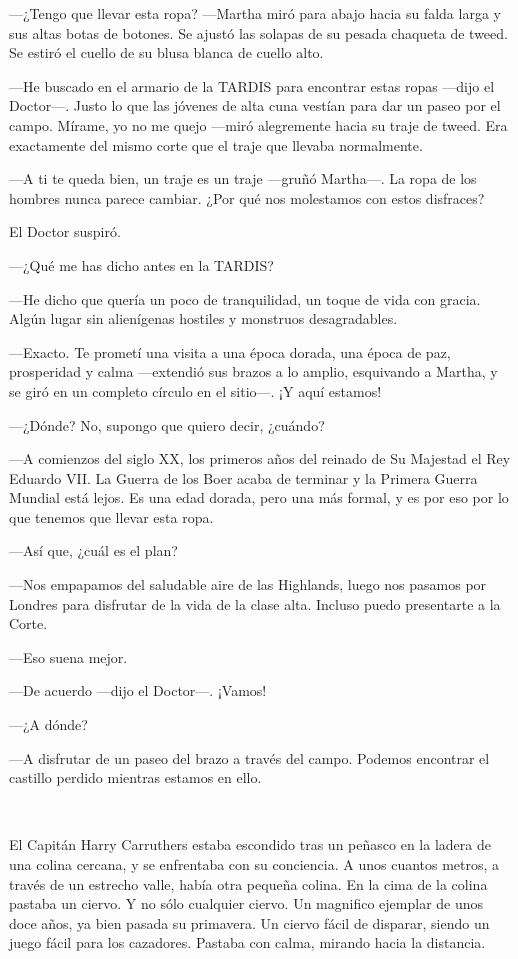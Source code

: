 ---¿Tengo que llevar esta ropa? ---Martha miró para abajo hacia su falda
larga y sus altas botas de botones. Se ajustó las solapas de su pesada
chaqueta de tweed. Se estiró el cuello de su blusa blanca de cuello
alto.

---He buscado en el armario de la TARDIS para encontrar estas ropas
---dijo el Doctor---. Justo lo que las jóvenes de alta cuna vestían para
dar un paseo por el campo. Mírame, yo no me quejo ---miró alegremente
hacia su traje de tweed. Era exactamente del mismo corte que el traje
que llevaba normalmente.

---A ti te queda bien, un traje es un traje ---gruñó Martha---. La ropa
de los hombres nunca parece cambiar. ¿Por qué nos molestamos con estos
disfraces?

El Doctor suspiró.

---¿Qué me has dicho antes en la TARDIS?

---He dicho que quería un poco de tranquilidad, un toque de vida con
gracia. Algún lugar sin alienígenas hostiles y monstruos desagradables.

---Exacto. Te prometí una visita a una época dorada, una época de paz,
prosperidad y calma ---extendió sus brazos a lo amplio, esquivando a
Martha, y se giró en un completo círculo en el sitio---. ¡Y aquí
estamos!

---¿Dónde? No, supongo que quiero decir, ¿cuándo?

---A comienzos del siglo XX, los primeros años del reinado de Su
Majestad el Rey Eduardo VII. La Guerra de los Boer acaba de terminar y
la Primera Guerra Mundial está lejos. Es una edad dorada, pero una más
formal, y es por eso por lo que tenemos que llevar esta ropa.

---Así que, ¿cuál es el plan?

---Nos empapamos del saludable aire de las Highlands, luego nos pasamos
por Londres para disfrutar de la vida de la clase alta. Incluso puedo
presentarte a la Corte.

---Eso suena mejor.

---De acuerdo ---dijo el Doctor---. ¡Vamos!

---¿A dónde?

---A disfrutar de un paseo del brazo a través del campo. Podemos
encontrar el castillo perdido mientras estamos en ello.

~

El Capitán Harry Carruthers estaba escondido tras un peñasco en la
ladera de una colina cercana, y se enfrentaba con su conciencia. A unos
cuantos metros, a través de un estrecho valle, había otra pequeña
colina. En la cima de la colina pastaba un ciervo. Y no sólo cualquier
ciervo. Un magnifico ejemplar de unos doce años, ya bien pasada su
primavera. Un ciervo fácil de disparar, siendo un juego fácil para los
cazadores. Pastaba con calma, mirando hacia la distancia.

